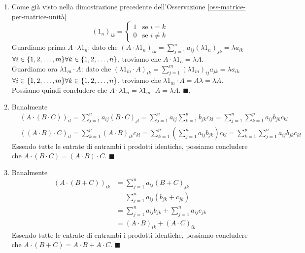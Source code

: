 \documentclass[11pt, a4paper, titlepage, oneside]{scrbook}
\begin{document}
\begin{enumerate}
    \item Come già visto nella dimostrazione precedente dell'Osservazione \ref{oss-matrice-per-matrice-unità}
    \[
    (1_n)_{ik} =
    \begin{cases}
     1 & \text{se } i = k \\
     0 & \text{se } i \neq k
    \end{cases}
    \]
    Guardiamo prima $A \cdot \lambda1_n$: dato che $(A \cdot \lambda1_n)_{ik} = \sum_{j = 1}^n a_{ij}(\lambda 1_n)_{jk} = \lambda a_{ik}$ $\forall i \in \{1,2,\ldots,m\} \\ \forall k \in \{1,2,\ldots,n\}$, troviamo che $A \cdot \lambda 1_n = \lambda A$. \\
    Guardiamo ora $\lambda 1_m \cdot A$: dato che $(\lambda 1_m \cdot A)_{ik} = \sum_{j = 1}^m (\lambda 1_m)_{ij} a_{jk} = \lambda a_{ik}$ $\forall i \in \{1,2,\ldots,m\} \\ \forall k \in \{1,2,\ldots,n\}$, troviamo che $\lambda 1_m \cdot A = A \lambda = \lambda A$. \\
    Possiamo quindi concludere che $A \cdot \lambda 1_n = \lambda 1_m \cdot A  = \lambda A$. $\blacksquare$.
    \item Banalmente
    \begin{align*}
    &(A \cdot (B \cdot C))_{il} = \sum_{j = 1}^n a_{ij} (B \cdot C)_{jl} = \sum_{j = 1}^n a_{ij} \sum_{k = 1}^p b_{jk}c_{kl} = \sum_{j = 1}^n \sum_{k = 1}^p a_{ij} b_{jk} c_{kl} \\
    &((A \cdot B) \cdot C)_{il} = \sum_{k = 1}^p (A \cdot B)_{ik} c_{kl} = \sum_{k = 1}^p \left(\sum_{j = 1}^n a_{ij} b_{jk}\right) c_{kl} = \sum_{k = 1}^p \sum_{j = 1}^n a_{ij} b_{jk} c_{kl}
    \end{align*}
    Essendo tutte le entrate di entrambi i prodotti identiche, possiamo concludere che \mbox{$A \cdot (B \cdot C) = (A \cdot B) \cdot C$}. $\blacksquare$
    \item Banalmente
    \begin{align*}
    (A \cdot (B + C))_{ik} &= \sum_{j = 1}^n a_{ij}(B + C)_{jk} \\ 
    &= \sum_{j = 1}^n a_{ij}(b_{jk} + c_{jk}) \\
    &= \sum_{j = 1}^n a_{ij} b_{jk} + \sum_{j = 1}^n a_{ij} c_{jk} \\
    &= (A \cdot B)_{ik} + (A \cdot C)_{ik}
    \end{align*}
    Essendo tutte le entrate di entrambi i prodotti identiche, possiamo concludere che \mbox{$A \cdot (B + C) = A \cdot B + A \cdot C$}. $\blacksquare$
\end{enumerate}
\end{document}

